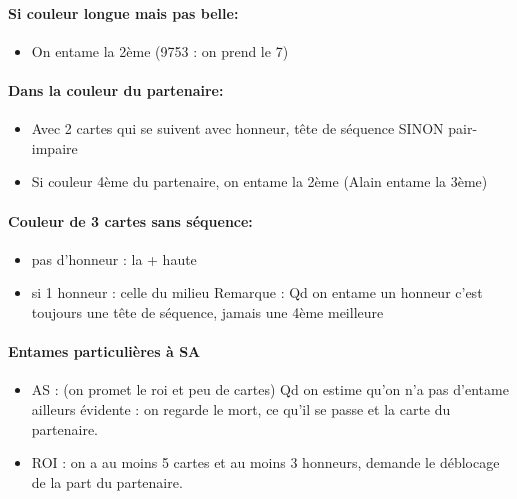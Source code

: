 \documentclass[a4paper]{article}
\begin{document}
\paragraph{Si couleur longue mais pas belle:}

\begin{itemize}
\item On entame la 2ème (9753 : on prend le 7)

\end{itemize}

\paragraph{Dans la couleur du partenaire:}

\begin{itemize}
\item Avec 2 cartes qui se suivent avec honneur, tête de séquence SINON pair-impaire

\item Si couleur 4ème du partenaire, on entame la 2ème (Alain entame la 3ème)

\end{itemize}

\paragraph{Couleur de 3 cartes sans séquence:}

\begin{itemize}
\item pas d’honneur : la + haute

\item si 1 honneur : celle du milieu
  Remarque : Qd on entame un honneur c’est toujours une tête de séquence, jamais une 4ème meilleure

\end{itemize}

\paragraph{Entames particulières à SA}

\begin{itemize}
\item AS : (on promet le roi et peu de cartes) Qd on estime qu’on n’a pas d’entame ailleurs évidente : on regarde le mort, ce qu’il se passe et la carte du partenaire.

\item ROI : on a au moins 5 cartes et au moins 3 honneurs, demande le déblocage de la part du partenaire.

\end{itemize}
\end{document}

